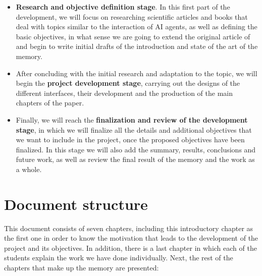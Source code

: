 \begin{itemize}
	
	\item \textbf{Research and objective definition stage}. In this first part of the development, we will focus on researching scientific articles and books that deal with topics similar to the interaction of AI agents, as well as defining the basic objectives, in what sense we are going to extend the original article of \ga and begin to write initial drafts of the introduction and state of the art of the memory.
	
	\item After concluding with the initial research and adaptation to the topic, we will begin the \textbf{project development stage}, carrying out the designs of the different interfaces, their development and the production of the main chapters of the paper.
	
	\item Finally, we will reach the \textbf{finalization and review of the development stage}, in which we will finalize all the details and additional objectives that we want to include in the project, once the proposed objectives have been finalized. In this stage we will also add the summary, results, conclusions and future work, as well as review the final result of the memory and the work as a whole.
\end{itemize}

\section*{Document structure}

This document consists of seven chapters, including this introductory chapter as the first one in order to know the motivation that leads to the development of the project and its objectives. In addition, there is a last chapter in which each of the students explain the work we have done individually. Next, the rest of the chapters that make up the memory are presented:


